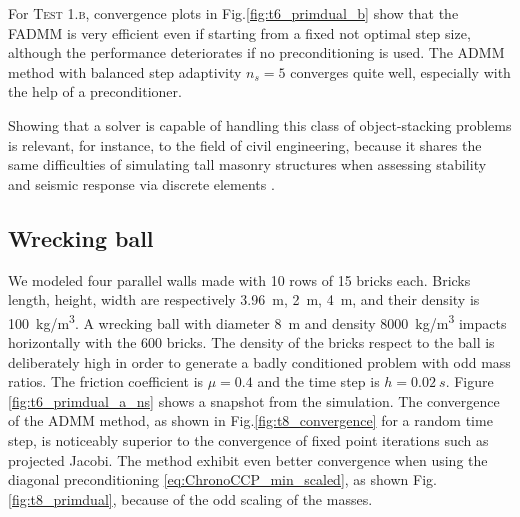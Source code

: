 \documentclass[AMA,STIX1COL]{WileyNJD-v2}
\begin{document}
For \textsc{Test 1.b}, convergence plots in Fig.\ref{fig:t6_primdual_b} show that the FADMM is very efficient even if starting from 
a fixed not optimal step size, although the performance deteriorates if no preconditioning is used. The ADMM method with balanced 
step adaptivity $n_s=5$ converges quite well, especially with the help of a preconditioner.

Showing that a solver is capable of handling this class of object-stacking problems is relevant, for instance,
to the field of civil engineering, because it shares the same difficulties of simulating tall masonry structures 
when assessing stability and seismic response via discrete elements \cite{Beatini2017}. 



\subsection{Wrecking ball}

We modeled four parallel walls made with 10 rows of 15 bricks each. Bricks length, height, width are respectively \SI{3.96}{m}, \SI{2}{m}, \SI{4}{m}, and their density is \SI{100}{kg/m^3}.  A wrecking ball with diameter \SI{8}{m} and density \SI{8000}{kg/m^3} impacts horizontally with the 600 bricks.  The density of the bricks respect to the ball is deliberately high in order to generate a badly conditioned problem with odd mass ratios. The friction coefficient is $\mu=0.4$ and the time step is $h=\SI{0.02}{s}$. Figure \ref{fig:t6_primdual_a_ns} shows a snapshot from the simulation.
The convergence of the ADMM method, as shown in Fig.\ref{fig:t8_convergence} for a random time step, is noticeably superior to the convergence of fixed point iterations such as projected Jacobi. The method exhibit even better convergence when using the diagonal preconditioning \eqref{eq:ChronoCCP_min_scaled}, as shown Fig.\ref{fig:t8_primdual}, because of the odd scaling of the masses.
\end{document}
